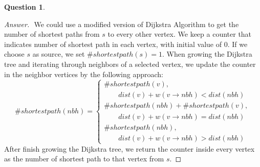 \documentclass{article}
\theoremstyle{plain}
\newtheorem{question}{Question}
\newenvironment{answer}[1][Answer]
    {\begin{proof}[#1]{$ $}\renewcommand\qedsymbol{$\vartriangle$}}
    {\end{proof}}
\begin{document}
\begin{question}
\end{question}
\begin{answer}
    We could use a modified version of Dijkstra Algorithm to get the number of shortest paths from $s$ to every other vertex. We keep a counter that indicates number of shortest path in each vertex, with initial value of $0$. If we choose $s$ as source, we set $\#shortestpath(s)=1$. When growing the Dijkstra tree and iterating through neighbors of a selected vertex, we update the counter in the neighbor vertices by the following approach:
    \begin{equation*}
        \#shortestpath(nbh) =
        \begin{cases}
            \#shortestpath(v),\\
            \quad \quad dist(v) + w(v \rightarrow nbh) < dist(nbh)\\
            \#shortestpath(nbh)+\#shortestpath(v),\\
            \quad \quad dist(v) + w(v \rightarrow nbh)= dist(nbh) \\
            \#shortestpath(nbh),\\
            \quad \quad dist(v) + w(v \rightarrow nbh) > dist(nbh)
        \end{cases}
    \end{equation*}
    After finish growing the Dijkstra tree, we return the counter inside every vertex as the number of shortest path to that vertex from $s$.
\end{answer}
\end{document}
